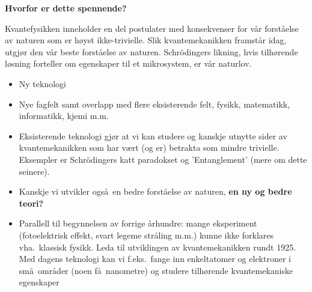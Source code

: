
\Large
\begin{center}
   \begin{minipage}{0.8\textwidth}
       \vspace*{0.5cm}
       \begin{center}
            { \LARGE \bf Hvorfor er dette spennende?}
       \end{center}
        Kvantefysikken inneholder en del postulater med konsekvenser
        for v\aa r forst\aa else av naturen som er h\o yst ikke-trivielle.
        Slik kvantemekanikken framst\aa r idag, utgj\o r den v\aa r beste
        forst\aa else av naturen. Schr\"odingers likning, hvis tilh\o rende l\o sning forteller om egenskaper til et mikrosystem,  er v\aa r naturlov. 
        
       \begin{center}
           \begin{itemize}
               \item Ny teknologi
               \item Nye fagfelt samt overlapp med flere eksisterende
                     felt, fysikk, matematikk, informatikk, kjemi m.m.
               \item Eksisterende teknologi gj\o r at vi kan studere
                     og kanskje utnytte sider av kvantemekanikken
                     som har v\ae rt (og er) betrakta som mindre
                     trivielle. Eksempler er Schr\"odingers katt 
                     paradokset og 'Entanglement' (mere om dette seinere).  
               \item Kanskje vi utvikler ogs\aa\ en bedre forst\aa else av
                     naturen, {\bf en ny og bedre teori?}
               \item Parallell til begynnelsen av forrige \aa rhundre:
                     mange eksperiment (fotoelektrisk effekt, svart legeme str\aa ling m.m.) kunne ikke forklares vha.~klassisk fysikk. Leda til utviklingen
av kvantemekanikken rundt 1925.  Med dagens teknologi kan vi f.eks.~fange inn enkeltatomer og elektroner i sm\aa\ omr\aa der (noen f\aa\ nanometre) 
og studere tilh\o rende kvantemekaniske egenskaper                 
           \end{itemize}
       \end{center}

\end{minipage}
\end{center}


